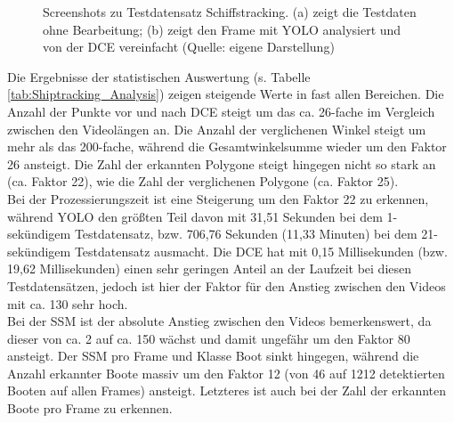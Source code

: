 {\begin{figure}[ht]
		\caption[Screenshots zu Testdatensatz Schiffstracking]{Screenshots zu Testdatensatz Schiffstracking. (a) zeigt die Testdaten ohne Bearbeitung; (b) zeigt den Frame mit YOLO analysiert und von der DCE vereinfacht (Quelle: eigene Darstellung)}
		\label{Scr:Testdatensatz_Shiptracking}
	\end{figure} 
	Die Ergebnisse der statistischen Auswertung (s. Tabelle \ref{tab:Shiptracking_Analysis}) zeigen steigende Werte in fast allen Bereichen. Die Anzahl der Punkte vor und nach DCE steigt um das ca. 26-fache im Vergleich zwischen den Videolängen an. Die Anzahl der verglichenen Winkel steigt um mehr als das 200-fache, während die Gesamtwinkelsumme wieder um den Faktor 26  ansteigt. Die Zahl der erkannten Polygone steigt hingegen nicht so stark an (ca. Faktor 22), wie die Zahl der verglichenen Polygone (ca. Faktor 25). \\
	Bei der Prozessierungszeit ist eine Steigerung um den Faktor 22 zu erkennen, während YOLO den größten Teil davon mit 31,51 Sekunden bei dem 1-sekündigem Testdatensatz, bzw. 706,76 Sekunden (11,33 Minuten) bei dem 21-sekündigem Testdatensatz ausmacht. Die DCE hat mit 0,15 Millisekunden (bzw. 19,62 Millisekunden) einen sehr geringen Anteil an der Laufzeit bei diesen Testdatensätzen, jedoch ist hier der Faktor für den Anstieg zwischen den Videos mit ca. 130 sehr hoch. \\
	Bei der SSM ist der absolute Anstieg zwischen den Videos bemerkenswert, da dieser von ca. 2 auf ca. 150 wächst und damit ungefähr um den Faktor 80 ansteigt. Der SSM pro Frame und Klasse Boot sinkt hingegen, während die Anzahl erkannter Boote massiv um den Faktor 12 (von 46 auf 1212 detektierten Booten auf allen Frames) ansteigt. Letzteres ist auch bei der Zahl der erkannten Boote pro Frame zu erkennen. \\

}
